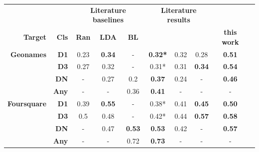 \begin{table}[H]
	\label{tab:f1_geonames_foursquare_all}
\end{table}



\begin{table}[H]
	\centering
	\begin{tabular}{rr|ccc|ccc|cc} 
	& & \multicolumn{3}{c|}{\footnotesize \textbf{Literature baselines}} & \multicolumn{3}{c|}{\footnotesize \textbf{Literature results}} & \\ \noalign{\vskip-2pt}
	\textbf{Target} &
	  \textbf{Cls} &
	  \textbf{Ran} &
	  \textbf{LDA} &
	  \textbf{BL} &
	  \textbf{\cite{Derrac2015}} &
	  \textbf{\cite{Ager2018}} &
	  \textbf{\cite{Alshaikh2020}} &
	  \textbf{this work} \\ \midrule
	\textbf{Geonames}    & \textbf{D1}  & 0.23 & \textbf{0.34} & -             & \textbf{0.32*} & 0.32 & 0.28          & \textbf{0.51} \\
						 & \textbf{D3}  & 0.27 & 0.32          & -             & 0.31*          & 0.31 & \textbf{0.34} & \textbf{0.54} \\
						 & \textbf{DN}  & -    & 0.27          & 0.2           & \textbf{0.37}  & 0.24 & -             & \textbf{0.46} \\
	\multicolumn{1}{l}{} & \textbf{Any} & -    & -             & 0.36          & \textbf{0.41}  & -    & -             & -            \\
	\textbf{Foursquare}  & \textbf{D1}  & 0.39 & \textbf{0.55} & -             & 0.38*          & 0.41 & \textbf{0.45} & \textbf{0.50} \\
	& \textbf{D3}  & 0.5  & 0.48          & -             & 0.42*          & 0.44 & \textbf{0.57} & \textbf{0.58} \\
	& \textbf{DN}  & -    & 0.47          & \textbf{0.53} & \textbf{0.53}  & 0.42 & -             & \textbf{0.57} \\
\multicolumn{1}{l}{} & \textbf{Any} & -    & -             & 0.72          & \textbf{0.73}  & -    & -             & -             
	\end{tabular}%
\end{table}
